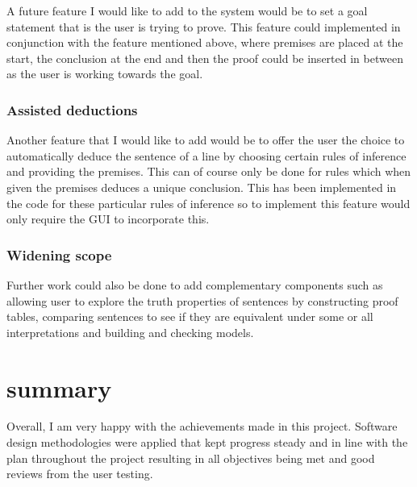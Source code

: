 A future feature I would like to add to the system would be to set a goal statement that is the user is trying to prove. This feature could implemented in conjunction with the feature mentioned above, where premises are placed at the start, the conclusion at the end and then the proof could be inserted in between as the user is working towards the goal.


\subsubsection*{Assisted deductions}

Another feature that I would like to add would be to offer the user the choice to automatically deduce the sentence of a line by choosing certain rules of inference and providing the premises. This can of course only be done for rules which when given the premises deduces a unique conclusion. This has been implemented in the code for these particular rules of inference so to implement this feature would only require the GUI to incorporate this.

\subsubsection*{Widening scope}

Further work could also be done to add complementary components such as allowing user to explore the truth properties of sentences by constructing proof tables, comparing sentences to see if they are equivalent under some or all interpretations and building and checking models.



\section{summary}

Overall, I am very happy with the achievements made in this project. Software design methodologies were applied that kept progress steady and in line with the plan throughout the project resulting in all objectives being met and good reviews from the user testing.